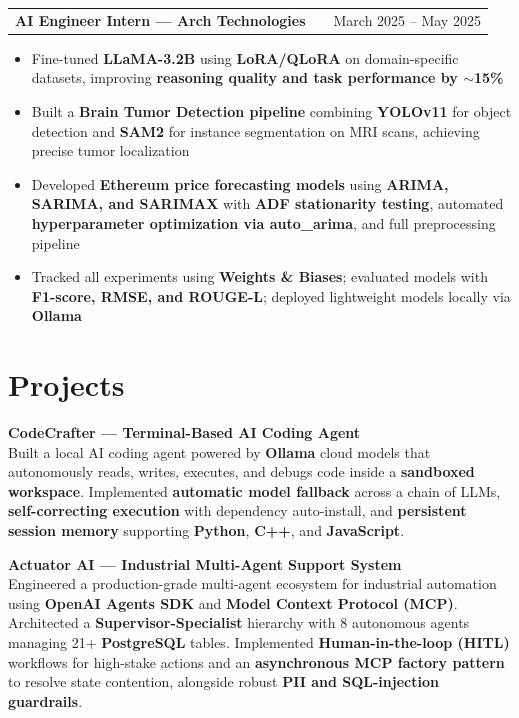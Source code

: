 \documentclass[a4paper,12pt]{article}
\makeatletter
\newenvironment{joblong}[2]
{
  \begin{tabularx}{\linewidth}{@{}l X r@{}}
  \textbf{#1} & \hfill & #2 \\
  \end{tabularx}
  \vspace{-8pt}
  \begin{itemize}[nosep,leftmargin=1.5em,itemsep=2pt,label=--]
}
{
  \end{itemize}
}
\makeatother
\begin{document}
\begin{joblong}{AI Engineer Intern — Arch Technologies}{March 2025 -- May 2025}
\item Fine-tuned \textbf{LLaMA-3.2B} using \textbf{LoRA/QLoRA} on domain-specific datasets, improving \textbf{reasoning quality and task performance by $\sim$15\%}
\item Built a \textbf{Brain Tumor Detection pipeline} combining \textbf{YOLOv11} for object detection and \textbf{SAM2} for instance segmentation on MRI scans, achieving precise tumor localization
\item Developed \textbf{Ethereum price forecasting models} using \textbf{ARIMA, SARIMA, and SARIMAX} with \textbf{ADF stationarity testing}, automated \textbf{hyperparameter optimization via auto\_arima}, and full preprocessing pipeline
\item Tracked all experiments using \textbf{Weights \& Biases}; evaluated models with \textbf{F1-score, RMSE, and ROUGE-L}; deployed lightweight models locally via \textbf{Ollama}
\end{joblong}

\section{Projects}

\textbf{CodeCrafter — Terminal-Based AI Coding Agent} \\
Built a local AI coding agent powered by \textbf{Ollama} cloud models that autonomously reads, writes, executes, and debugs code inside a \textbf{sandboxed workspace}. Implemented \textbf{automatic model fallback} across a chain of LLMs, \textbf{self-correcting execution} with dependency auto-install, and \textbf{persistent session memory} supporting \textbf{Python}, \textbf{C++}, and \textbf{JavaScript}.

\vspace{4pt}

\textbf{Actuator AI — Industrial Multi-Agent Support System} \\
Engineered a production-grade multi-agent ecosystem for industrial automation using \textbf{OpenAI Agents SDK} and \textbf{Model Context Protocol (MCP)}. Architected a \textbf{Supervisor-Specialist} hierarchy with 8 autonomous agents managing 21+ \textbf{PostgreSQL} tables. Implemented \textbf{Human-in-the-loop (HITL)} workflows for high-stake actions and an \textbf{asynchronous MCP factory pattern} to resolve state contention, alongside robust \textbf{PII and SQL-injection guardrails}.
\end{document}
